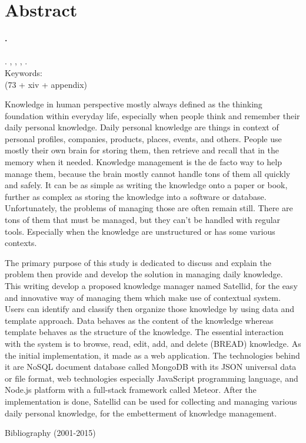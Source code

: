 
\begingroup
\let\clearpage\relax
\let\cleardoublepage\relax

\label{chap:abstract}
\chapter{Abstract}

\textbf{\myName.} \myNPM \\
\textbf{\myTitle} \\
\textbf{\myThesisType}. \myDepartmentLong, \myFacultyLong, \myUni, \myYear. \\
Keywords: \myKeywords \\
(73 + xiv + appendix)

\hfill

\singlespacing

Knowledge in human perspective mostly always defined as the thinking foundation within everyday life,
especially when people think and remember their daily personal knowledge.
Daily personal knowledge are things in context of personal profiles, companies, products, places, events, and others.
People use mostly their own brain for storing them, then retrieve and recall that in the memory when it needed.
Knowledge management is the de facto way to help manage them, because the brain mostly cannot handle tons of them all quickly and safely.
It can be as simple as writing the knowledge onto a paper or book, further as complex as storing the knowledge into a software or database.
Unfortunately, the problems of managing those are often remain still.
There are tons of them that must be managed, but they can’t be handled with regular tools.
Especially when the knowledge are unstructured or has some various contexts.

The primary purpose of this study is dedicated to discuss and explain the problem then provide and develop the solution in managing daily knowledge.
This writing develop a proposed knowledge manager named Satellid, for the easy and innovative way of managing them which make use of contextual system.
Users can identify and classify then organize those knowledge by using data and template approach.
Data behaves as the content of the knowledge whereas template behaves as the structure of the knowledge.
The essential interaction with the system is to browse, read, edit, add, and delete (BREAD) knowledge.
As the initial implementation, it made as a web application.
The technologies behind it are NoSQL document database called MongoDB with its JSON universal data or file format, web technologies especially JavaScript programming language, and Node.js platform with a full-stack framework called Meteor.
After the implementation is done, Satellid can be used for collecting and managing various daily personal knowledge, for the embetterment of knowledge management.

\onehalfspacing

\hfill


\noindent Bibliography (2001-2015)



\endgroup

\vfill
